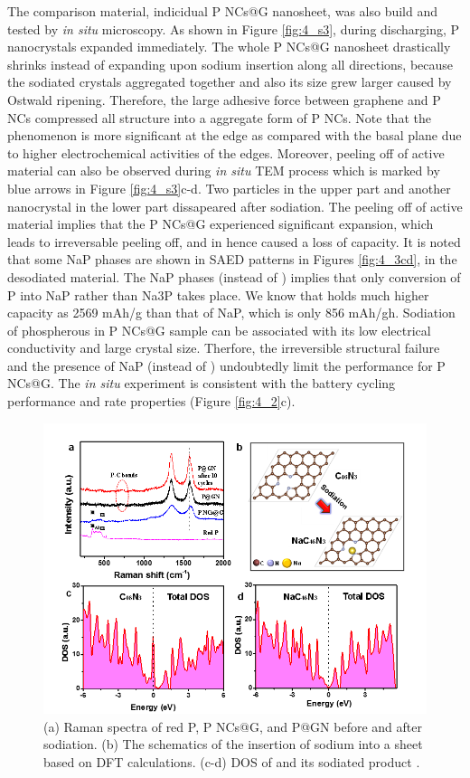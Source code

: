 The comparison material, indicidual P NCs@G nanosheet, was also build and tested by {\em in situ} microscopy. 
As shown in Figure \ref{fig:4_s3}, during discharging, P nanocrystals expanded immediately. 
The whole P NCs@G nanosheet drastically shrinks instead of expanding upon sodium insertion along all directions, because the sodiated crystals aggregated together and also its size grew larger caused by Ostwald ripening.
Therefore, the large adhesive force between graphene and P NCs compressed all structure into a aggregate form of P NCs. 
Note that the phenomenon is more significant at the edge as compared with the basal plane due to higher electrochemical activities of the edges. 
Moreover, peeling off of active material can also be observed during {\em in situ} TEM process which is marked by blue arrows in Figure \ref{fig:4_s3}c-d. Two particles in the upper part and another nanocrystal in the lower part dissapeared after sodiation. 
The peeling off of active material implies that the P NCs@G experienced significant expansion, which leads to irreversable peeling off, and in hence caused a loss of capacity. 
It is noted that some NaP phases are shown in SAED patterns in Figures \ref{fig:4_3cd}, in the desodiated material. The NaP phases (instead of ) implies that only conversion of P into NaP rather than Na3P takes place. We know that  holds much higher capacity as 2569 mAh/g than that of NaP, which is only 856 mAh/gh. 
Sodiation of phospherous in P NCs@G sample can be associated with its low electrical conductivity and large crystal size. 
Therfore, the irreversible structural failure and the presence of NaP (instead of ) undoubtedly limit the performance for P NCs@G. 
The {\em in situ} experiment is consistent with the battery cycling performance and rate properties (Figure \ref{fig:4_2}c). \\

\begin{figure}  
\includegraphics[measuredwidth=\textwidth]{figures/figure4_4}
\caption[Raman spectra and DFT calculations]
{
(a) Raman spectra of red P, P NCs@G, and P@GN before and after sodiation. 
(b) The schematics of the insertion of sodium into a  sheet based on DFT calculations. 
(c-d) DOS of  and its sodiated product .
\label{fig:4_4}}
\end{figure}

